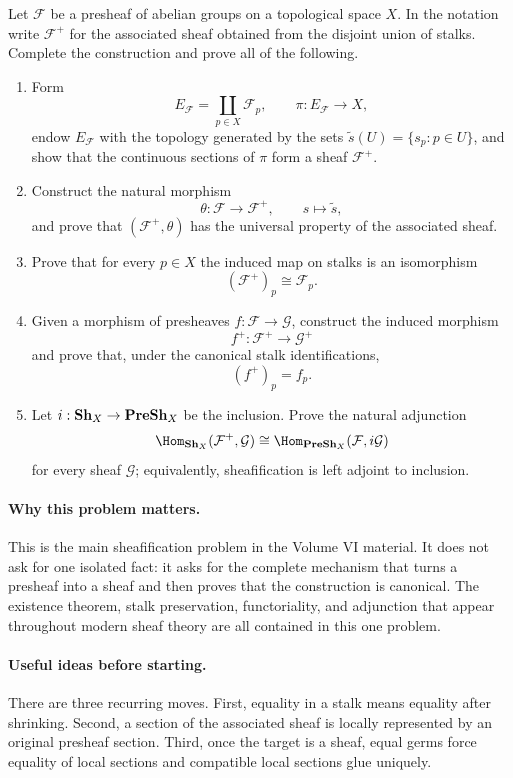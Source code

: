 \begin{problem}
Let $\mathcal F$ be a presheaf of abelian groups on a topological space $X$.  In the notation write $\mathcal F^+$ for the associated sheaf obtained from the disjoint union of
stalks.  Complete the construction and prove all of the following.
\begin{enumerate}
\item Form
\[
E_{\mathcal F}=\coprod_{p\in X}\mathcal F_p,
\qquad
\pi:E_{\mathcal F}\to X,
\]
endow $E_{\mathcal F}$ with the topology generated by the sets
$\widetilde s(U)=\{s_p:p\in U\}$, and show that the continuous sections of $\pi$ form a sheaf
$\mathcal F^+$.
\item Construct the natural morphism
\[
\theta:\mathcal F\longrightarrow\mathcal F^+,
\qquad
s\longmapsto\widetilde s,
\]
and prove that $(\mathcal F^+,\theta)$ has the universal property of the associated sheaf.
\item Prove that for every $p\in X$ the induced map on stalks is an isomorphism
\[
(\mathcal F^+)_p\cong\mathcal F_p.
\]
\item Given a morphism of presheaves $f:\mathcal F\to\mathcal G$, construct the induced
morphism
\[
f^+:\mathcal F^+\longrightarrow\mathcal G^+
\]
and prove that, under the canonical stalk identifications,
\[
(f^+)_p=f_p.
\]
\item Let $i:\mathbf{Sh}_X\to\mathbf{PreSh}_X$ be the inclusion.  Prove the natural adjunction
\[
\Hom_{\Sh_X}(\mathcal F^+,\mathcal G)
\cong
\Hom_{\PreSh_X}(\mathcal F,i\mathcal G)
\]
for every sheaf $\mathcal G$; equivalently, sheafification is left adjoint to inclusion.
\end{enumerate}
\end{problem}

\paragraph{Why this problem matters.}
This is the main sheafification problem in the Volume VI material.  It does not ask for
one isolated fact: it asks for the complete mechanism that turns a presheaf into a sheaf and
then proves that the construction is canonical.  The existence theorem, stalk preservation,
functoriality, and adjunction that appear throughout modern sheaf theory are all contained in
this one problem.

\paragraph{Useful ideas before starting.}
There are three recurring moves.  First, equality in a stalk means equality after shrinking.
Second, a section of the associated sheaf is locally represented by an original presheaf
section.  Third, once the target is a sheaf, equal germs force equality of local sections and
compatible local sections glue uniquely.

